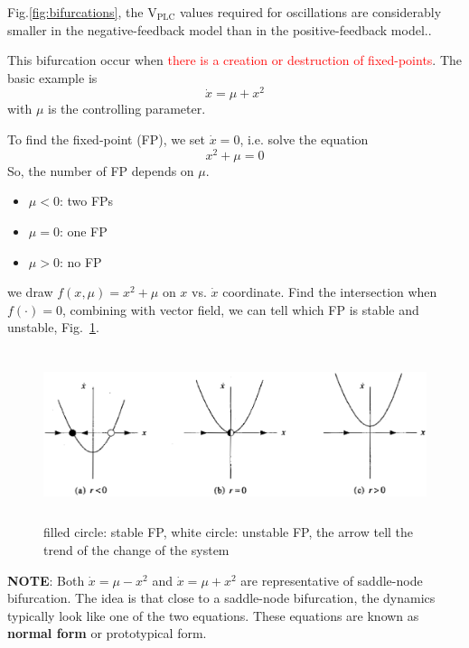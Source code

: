 Fig.\ref{fig:bifurcations}, the V$_\text{PLC}$ values required for oscillations
are considerably smaller in the negative-feedback model than in the
positive-feedback model..

This bifurcation occur when
\textcolor{red}{there is a creation or destruction of
  fixed-points}. The basic example is
\begin{equation}
  \label{eq:668}
  \dot{x} = \mu + x^2
\end{equation}
with $\mu$ is the controlling parameter.

To find the fixed-point (FP), we set $\dot{x}=0$, i.e. solve the equation
\begin{equation}
  \label{eq:56}
  x^2 + \mu = 0
\end{equation}
So, the number of FP depends on $\mu$.
\begin{itemize}
\item $\mu < 0$: two FPs
\item $\mu = 0$: one FP
\item $\mu > 0$: no FP
\end{itemize}
we draw $f(x,\mu)=x^2+\mu$ on $x$ vs. $\dot{x}$ coordinate. Find the
intersection when $f(\cdot) = 0$, combining with vector field, we can
tell which FP is stable and unstable, Fig.~\ref{fig:saddle_node_ex1}.

\begin{figure}[hbt]
  \centerline{\includegraphics[height=5cm,
    angle=0]{./images/saddle_node_ex1.eps}}
\caption{filled circle: stable FP, white circle: unstable FP, the
  arrow tell the trend of the change of the system}
\label{fig:saddle_node_ex1}
\end{figure}

{\bf NOTE}: Both $\dot{x}=\mu - x^2$ and $\dot{x}=\mu + x^2$  are
representative of saddle-node bifurcation. The idea is that close to a
saddle-node bifurcation, the dynamics typically look like one of the
two equations. These equations are known as {\bf normal form} or
prototypical form. 

